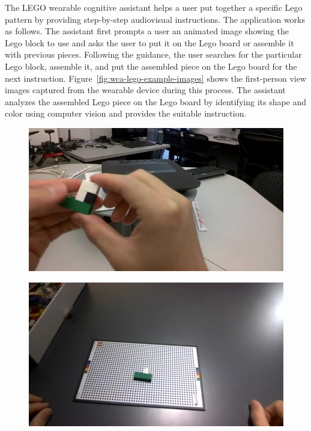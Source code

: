The LEGO wearable cognitive assistant helps a user put together a specific Lego
pattern by providing step-by-step audiovisual instructions. The application
works as follows. The assistant first prompts a user an animated image showing
the Lego block to use and asks the user to put it on the Lego board or assemble
it with previous pieces. Following the guidance, the user searches for the
particular Lego block, assemble it, and put the assembled piece on the Lego
board for the next instruction. Figure~\ref{fig:wca-lego-example-images} shows
the first-person view images captured from the wearable device during this
process. The assistant analyzes the assembled Lego piece on the Lego board by
identifying its shape and color using computer vision and provides the suitable
instruction.

\begin{figure}
    \centering
    \begin{minipage}[]{0.31\linewidth}
        \centering
        \includegraphics[width=\linewidth]{FIGS/lego-dataset-1}\\
    \end{minipage}
    \begin{minipage}[]{0.31\linewidth}
        \centering
        \includegraphics[width=\linewidth]{FIGS/lego-dataset-2}\\

\end{minipage}
\end{figure}
